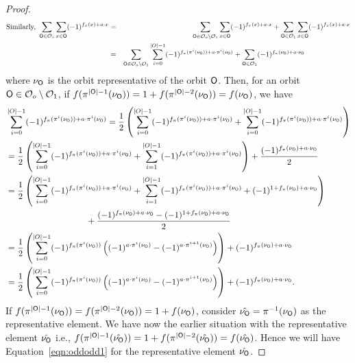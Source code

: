 \documentclass{llncs}
\begin{document}
\begin{proof}
\begin{eqnarray}\label{eqn:odd0}
\text{Similarly, } \sum_{\mathsf{O} \in \mathcal{O}_o} \sum_{x \in \mathsf{O}} (-1)^{ f_\pi(x) + a \cdot x}
& = & \sum_{\mathsf{O} \in \mathcal{O}_o\setminus\mathcal{O}_1} \sum_{x \in \mathsf{O}} (-1)^{ f_\pi(x) + a \cdot x} + \sum_{\mathsf{O} \in \mathcal{O}_1} \sum_{x \in \mathsf{O}} (-1)^{ f_\pi(x) + a \cdot x} \nonumber\\
& = & \sum_{\mathsf{O} \in \mathcal{O}_o\setminus\mathcal{O}_1} \sum_{i=0}^{|O|-1} (-1)^{ f_\pi(\pi^i(\nu_{\mathsf{O}})) + a \cdot \pi^i(\nu_{\mathsf{O}})} + \sum_{\mathsf{O} \in \mathcal{O}_1} (-1)^{ f_\pi(\nu_{\mathsf{O}}) + a \cdot \nu_{\mathsf{O}}}~~~~~~~~~~~~~~~~~~~
\end{eqnarray}
where $\nu_{\mathsf{O}}$ is the orbit representative of the orbit $\mathsf{O}$. Then, for an orbit $\mathsf{O} \in \mathcal{O}_o\setminus\mathcal{O}_1$,
if $f(\pi^{|\mathsf{O}|-1}(\nu_{\mathsf{O}})) = 1+f(\pi^{|\mathsf{O}|-2}(\nu_{\mathsf{O}})) = f(\nu_{\mathsf{O}})$, we have
\begin{align}\label{eqn:oddodd1}
& \sum_{i=0}^{|O|-1} (-1)^{ f_\pi(\pi^i(\nu_{\mathsf{O}}))+ a \cdot \pi^i(\nu_{\mathsf{O}})}  
= \frac{1}{2}\left(\sum_{i=0}^{|O|-1} (-1)^{ f_\pi(\pi^i(\nu_{\mathsf{O}})) + a \cdot \pi^i(\nu_{\mathsf{O}})}+\sum_{i=0}^{|O|-1} (-1)^{ f_\pi(\pi^i(\nu_{\mathsf{O}})) + a \cdot \pi^i(\nu_{\mathsf{O}})}\right) \nonumber\\
& = \frac{1}{2}\left(\sum_{i=0}^{|O|-1} (-1)^{ f_\pi(\pi^i(\nu_{\mathsf{O}})) + a \cdot \pi^i(\nu_{\mathsf{O}})}+\sum_{i=1}^{|O|-1} (-1)^{ f_\pi(\pi^i(\nu_{\mathsf{O}})) + a \cdot \pi^i(\nu_{\mathsf{O}})}\right) + \frac{(-1)^{f_\pi(\nu_{\mathsf{O}}) + a \cdot \nu_{\mathsf{O}}}}{2}\nonumber\\
& = \frac{1}{2}\left(\sum_{i=0}^{|O|-1} (-1)^{ f_\pi(\pi^i(\nu_{\mathsf{O}})) + a \cdot \pi^i(\nu_{\mathsf{O}})}+\sum_{i=1}^{|O|-1} (-1)^{ f_\pi(\pi^i(\nu_{\mathsf{O}})) + a \cdot \pi^i(\nu_{\mathsf{O}})}+(-1)^{1+f_\pi(\nu_{\mathsf{O}}) + a \cdot \nu_{\mathsf{O}}}\right) \nonumber\\
& ~~~~~~~~~~~~~~~~~~~~~~~~~~~~+ \frac{(-1)^{f_\pi(\nu_{\mathsf{O}}) + a \cdot \nu_{\mathsf{O}}}-(-1)^{1+f_\pi(\nu_{\mathsf{O}}) + a \cdot \nu_{\mathsf{O}}}}{2} \nonumber\\
& = \frac{1}{2}\left(\sum_{i=0}^{|O|-1} (-1)^{f_\pi(\pi^i(\nu_{\mathsf{O}}))}
\left((-1)^{a \cdot \pi^i(\nu_{\mathsf{O}})} - (-1)^{a \cdot \pi^{i+1}(\nu_{\mathsf{O}})}\right)\right) + (-1)^{f_\pi(\nu_{\mathsf{O}}) + a \cdot \nu_{\mathsf{O}}} \nonumber\\
& = \frac{1}{2}\left(\sum_{i=0}^{|O|-1} (-1)^{f_\pi(\pi^i(\nu_{\mathsf{O}}))}
\left((-1)^{a \cdot \pi^i(\nu_{\mathsf{O}})} - (-1)^{a \cdot \pi^{i+1}(\nu_{\mathsf{O}})}\right)\right) + (-1)^{f_\pi(\nu_{\mathsf{O}}) + a \cdot \nu_{\mathsf{O}}}.
\end{align}
If $f(\pi^{|\mathsf{O}|-1}(\nu_{\mathsf{O}})) = f(\pi^{|\mathsf{O}|-2}(\nu_{\mathsf{O}})) = 1+f(\nu_{\mathsf{O}})$, consider $\hat{\nu_{\mathsf{O}}} = \pi^{-1} (\nu_{\mathsf{O}})$ as the representative element. We have now the earlier situation with the representative element $\hat{\nu_{\mathsf{O}}}$ i.e., $f(\pi^{|\mathsf{O}|-1}(\hat{\nu_{\mathsf{O}}})) = 1+f(\pi^{|\mathsf{O}|-2}(\hat{\nu_{\mathsf{O}}})) = f(\hat{\nu_{\mathsf{O}}})$. Hence we will have Equation~\ref{eqn:oddodd1} for the representative element $\hat{\nu_{\mathsf{O}}}$.

\end{proof}
\end{document}
